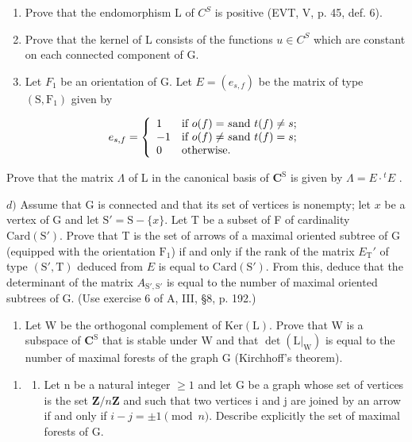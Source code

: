 \begin{enumerate}
\def\labelenumi{\alph{enumi})}
\item
  Prove that the endomorphism L of \(C^{S}\) is positive (EVT, V, p. 45, def. 6).
\item
  Prove that the kernel of L consists of the functions \(u \in C^{S}\) which are constant on each connected component of G.
\item
  Let \(F_{1}\) be an orientation of G. Let \(E = (e_{s,f})\) be the matrix of type \((\mathrm{S}, \mathrm{F}_{1})\) given by
\end{enumerate}

\[
 e _ {s, f} = \left\{ \begin{array}{l l} 1 & \text {if } o (f) = s \text {and } t (f) \neq s; \\ - 1 & \text {if } o (f) \neq s \text {and } t (f) = s; \\ 0 & \text {otherwise. } \end{array} \right.
\]

Prove that the matrix \(\Lambda\) of L in the canonical basis of \(\mathbf{C}^{\mathrm{S}}\) is given by \(\Lambda = E\cdot {}^{t}E\) .

\(d)\) Assume that G is connected and that its set of vertices is nonempty; let \(x\) be a vertex of G and let \(\mathrm{S}' = \mathrm{S} - \{x\}\). Let T be a subset of F of cardinality \(\mathrm{Card}(\mathrm{S}')\). Prove that T is the set of arrows of a maximal oriented subtree of G (equipped with the orientation \(\mathrm{F}_1\)) if and only if the rank of the matrix \(E_{\mathrm{T}}'\) of type \((\mathrm{S}',\mathrm{T})\) deduced from \(E\) is equal to \(\mathrm{Card}(\mathrm{S}')\). From this, deduce that the determinant of the matrix \(A_{\mathrm{S}',\mathrm{S}'}\) is equal to the number of maximal oriented subtrees of G. (Use exercise 6 of A, III, §8, p. 192.)

\begin{enumerate}
\def\labelenumi{\alph{enumi})}
\setcounter{enumi}{4}
\tightlist
\item
  Let W be the orthogonal complement of \(\mathrm{Ker}(\mathrm{L})\). Prove that W is a subspace of \(\mathbf{C}^{\mathrm{S}}\) that is stable under W and that \(\det (\mathrm{L}|_{\mathrm{W}})\) is equal to the number of maximal forests of the graph G (Kirchhoff's theorem).
\end{enumerate}

\begin{enumerate}
\def\labelenumi{\arabic{enumi})}
\setcounter{enumi}{4}
\tightlist
\item
  \begin{enumerate}
  \def\labelenumii{\alph{enumii})}
  \tightlist
  \item
    Let n be a natural integer \(\geqslant 1\) and let G be a graph whose set of vertices is the set \(\mathbf{Z}/n\mathbf{Z}\) and such that two vertices i and j are joined by an arrow if and only if \(i-j=\pm1\pmod n\). Describe explicitly the set of maximal forests of G.
  \end{enumerate}
\end{enumerate}

